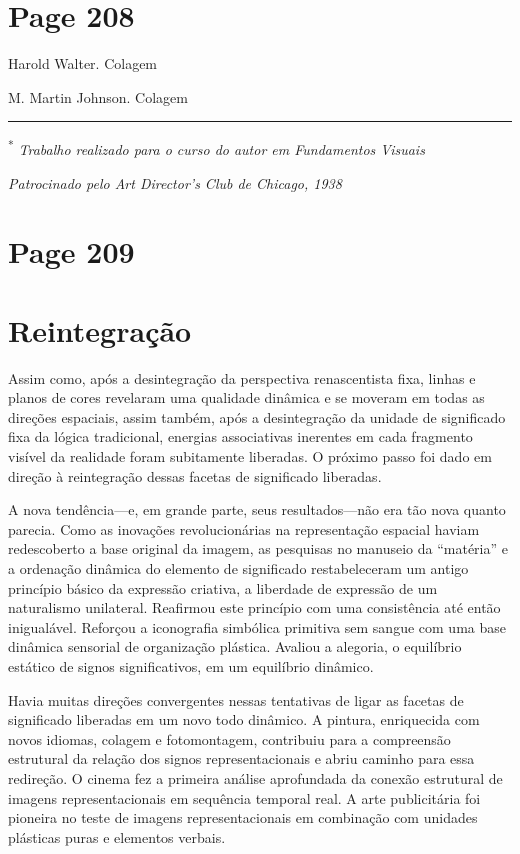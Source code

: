 \documentclass[a4paper]{article}
\begin{document}
\vfill
{}

\newpage
\section*{Page 208}

Harold Walter. Colagem

M. Martin Johnson. Colagem

\noindent\rule{\linewidth}{0.4pt}
\vspace{6pt}
\textsuperscript{*} \textit{Trabalho realizado para o curso do autor em Fundamentos Visuais}

\textit{Patrocinado pelo Art Director's Club de Chicago, 1938}

\newpage
\section*{Page 209}

\section*{Reintegração}

Assim como, após a desintegração da perspectiva renascentista fixa, linhas e planos de cores revelaram uma qualidade dinâmica e se moveram em todas as direções espaciais, assim também, após a desintegração da unidade de significado fixa da lógica tradicional, energias associativas inerentes em cada fragmento visível da realidade foram subitamente liberadas. O próximo passo foi dado em direção à reintegração dessas facetas de significado liberadas.

A nova tendência---e, em grande parte, seus resultados---não era tão nova quanto parecia. Como as inovações revolucionárias na representação espacial haviam redescoberto a base original da imagem, as pesquisas no manuseio da ``matéria'' e a ordenação dinâmica do elemento de significado restabeleceram um antigo princípio básico da expressão criativa, a liberdade de expressão de um naturalismo unilateral. Reafirmou este princípio com uma consistência até então inigualável. Reforçou a iconografia simbólica primitiva sem sangue com uma base dinâmica sensorial de organização plástica. Avaliou a alegoria, o equilíbrio estático de signos significativos, em um equilíbrio dinâmico.

Havia muitas direções convergentes nessas tentativas de ligar as facetas de significado liberadas em um novo todo dinâmico. A pintura, enriquecida com novos idiomas, colagem e fotomontagem, contribuiu para a compreensão estrutural da relação dos signos representacionais e abriu caminho para essa redireção. O cinema fez a primeira análise aprofundada da conexão estrutural de imagens representacionais em sequência temporal real. A arte publicitária foi pioneira no teste de imagens representacionais em combinação com unidades plásticas puras e elementos verbais.
\end{document}
